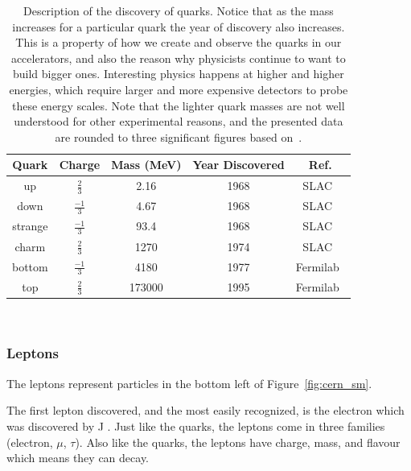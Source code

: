 \begin{table}
\begin{center}
\begin{tabular}{||c c c c c||}
 \hline
 Quark & Charge & Mass (MeV) & Year Discovered & Ref.\\ [0.5ex]
 \hline\hline
 up & $\frac{2}{3}$ & 2.16 & 1968 & SLAC~\citep{1969PhRvL..23..930B, 1969PhRvL..23..935B} \\
 \hline
 down & $\frac{-1}{3}$ & 4.67 & 1968 & SLAC~\citep{1969PhRvL..23..930B, 1969PhRvL..23..935B} \\
 \hline
 strange & $\frac{-1}{3}$ & 93.4 & 1968 & SLAC~\citep{1969PhRvL..23..930B, 1969PhRvL..23..935B} \\
 \hline
 charm & $\frac{2}{3}$ & 1270 & 1974 & SLAC~\citep{Jpsi_PhysRevLett.33.1404} \\
 \hline
 bottom & $\frac{-1}{3}$ & 4180 & 1977 & Fermilab~\citep{bottom_PhysRevLett.39.252}\\
 \hline
 top & $\frac{2}{3}$ & 173000 & 1995 & Fermilab~\citep{topquark_Abachi_1995} \\
 \hline
\end{tabular}
\caption{Description of the discovery of quarks. Notice that as the mass increases for a particular quark the year of discovery also increases. This is a property of how we create and observe the quarks in our accelerators, and also the reason why physicists continue to want to build bigger ones. Interesting physics happens at higher and higher energies, which require larger and more expensive detectors to probe these energy scales. Note that the lighter quark masses are not well understood for other experimental reasons, and the presented data are rounded to three significant figures based on~\citep{Workman:2022ynf}.}
\end{center}
\end{table}
~\label{table:quark}

\subsubsection{Leptons}

The leptons represent particles in the bottom left of Figure~\ref{fig:cern_sm}.

The first lepton discovered, and the most easily recognized, is the electron which was discovered by J .
Just like the quarks, the leptons come in three families (electron, $\mu$, $\tau$).
Also like the quarks, the leptons have charge, mass, and flavour which means they can decay.


